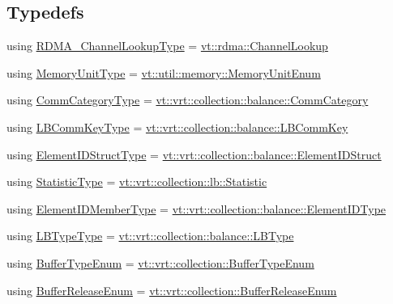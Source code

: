 \subsection*{Typedefs}
\begin{DoxyCompactItemize}
\item 
using \hyperlink{namespacestd_a30c426bd959ae4c3814e36d01efe9df7}{R\+D\+M\+A\+\_\+\+Channel\+Lookup\+Type} = \hyperlink{structvt_1_1rdma_1_1_channel_lookup}{vt\+::rdma\+::\+Channel\+Lookup}
\item 
using \hyperlink{namespacestd_ad7105ed4fa94bea7fce7b09cea2c7165}{Memory\+Unit\+Type} = \hyperlink{namespacevt_1_1util_1_1memory_a64df3d84293b34009f78e2a1db2f9bb6}{vt\+::util\+::memory\+::\+Memory\+Unit\+Enum}
\item 
using \hyperlink{namespacestd_a4dd27d43e4725feae37124932561af56}{Comm\+Category\+Type} = \hyperlink{namespacevt_1_1vrt_1_1collection_1_1balance_a9cc6c6884ca0416dae824e9204093c57}{vt\+::vrt\+::collection\+::balance\+::\+Comm\+Category}
\item 
using \hyperlink{namespacestd_a3a6802ab62d3595b44a8463f8e654c31}{L\+B\+Comm\+Key\+Type} = \hyperlink{structvt_1_1vrt_1_1collection_1_1balance_1_1_l_b_comm_key}{vt\+::vrt\+::collection\+::balance\+::\+L\+B\+Comm\+Key}
\item 
using \hyperlink{namespacestd_af20b73e88e055920f8203d35581f5a84}{Element\+I\+D\+Struct\+Type} = \hyperlink{structvt_1_1vrt_1_1collection_1_1balance_1_1_element_i_d_struct}{vt\+::vrt\+::collection\+::balance\+::\+Element\+I\+D\+Struct}
\item 
using \hyperlink{namespacestd_a77b0310083adc8639f9659f5c8b3cf0d}{Statistic\+Type} = \hyperlink{namespacevt_1_1vrt_1_1collection_1_1lb_af0e20ef9afee77295053aa83bf1348b1}{vt\+::vrt\+::collection\+::lb\+::\+Statistic}
\item 
using \hyperlink{namespacestd_a3cd9aec8ec8ce32b482297c691c903e8}{Element\+I\+D\+Member\+Type} = \hyperlink{namespacevt_1_1vrt_1_1collection_1_1balance_a14c8d2c972f2913aa3f1636e5be0a120}{vt\+::vrt\+::collection\+::balance\+::\+Element\+I\+D\+Type}
\item 
using \hyperlink{namespacestd_ae3c14c256fabd8bbed83c439b367c3d8}{L\+B\+Type\+Type} = \hyperlink{namespacevt_1_1vrt_1_1collection_1_1balance_ac4f99693509affcc67db182d4aad9b5c}{vt\+::vrt\+::collection\+::balance\+::\+L\+B\+Type}
\item 
using \hyperlink{namespacestd_ab5492c80007bc5a00cc49a954c809d6f}{Buffer\+Type\+Enum} = \hyperlink{namespacevt_1_1vrt_1_1collection_a1b1b082e2ff4e9e5d1b7227acd78db3f}{vt\+::vrt\+::collection\+::\+Buffer\+Type\+Enum}
\item 
using \hyperlink{namespacestd_a881b600944be212a7a1b9ac199fb2f88}{Buffer\+Release\+Enum} = \hyperlink{namespacevt_1_1vrt_1_1collection_a2545006e681bacc1f00be9d5d6bdc8fa}{vt\+::vrt\+::collection\+::\+Buffer\+Release\+Enum}
\end{DoxyCompactItemize}


